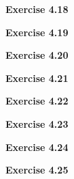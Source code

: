 \documentclass{article}
\begin{document}
\bigskip

\begin{framed}
    \noindent \textbf{Exercise 4.18}
    
    \medskip
    
    
\end{framed}


\bigskip

\begin{framed}
    \noindent \textbf{Exercise 4.19}
    
    \medskip
    
    
\end{framed}


\bigskip

\begin{framed}
    \noindent \textbf{Exercise 4.20}
    
    \medskip
    
    
\end{framed}


\bigskip

\begin{framed}
    \noindent \textbf{Exercise 4.21}
    
    \medskip
    
    
\end{framed}


\bigskip

\begin{framed}
    \noindent \textbf{Exercise 4.22}
    
    \medskip
    
    
\end{framed}


\bigskip

\begin{framed}
    \noindent \textbf{Exercise 4.23}
    
    \medskip
    
    
\end{framed}


\bigskip

\begin{framed}
    \noindent \textbf{Exercise 4.24}
    
    \medskip
    
    
\end{framed}


\bigskip

\begin{framed}
    \noindent \textbf{Exercise 4.25}
    
    \medskip
    
    
\end{framed}
\end{document}

